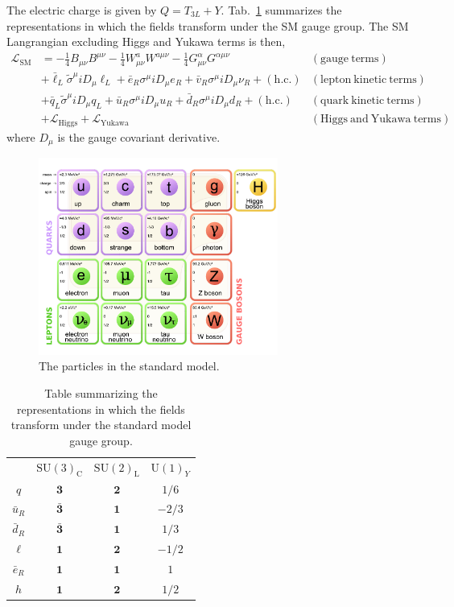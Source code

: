 The electric charge is given by $Q = T_{3L}+Y$. Tab.~\ref{tab:representations} summarizes the
representations in which the fields transform under the SM
gauge group. The SM Langrangian
excluding Higgs and Yukawa terms is then,
\begin{align}
\mathcal{L}_{\mathrm{SM}} &= -\frac{1}{4}B_{\mu\nu}B^{\mu\nu} -\frac{1}{4}W^{a}_{\mu\nu}W^{a\mu\nu} - \frac{1}{4}G^{\alpha}_{\mu\nu}G^{\alpha\mu\nu}
  & \mathrm{(gauge~terms)}\nonumber\\
& +\bar\ell_L\tilde\sigma^{\mu}iD_{\mu}\ell_L +
   \bar e_R\sigma^{\mu}iD_{\mu}e_R + \bar v_R
   \sigma^{\mu}iD_{\mu}\nu_R + (\mathrm{h.c.})& \mathrm{(lepton~kinetic~terms)}\nonumber\\
& +\bar q_L\tilde\sigma^{\mu}iD_{\mu}q_L +
   \bar u_R\sigma^{\mu}iD_{\mu}u_R + \bar d_R
   \sigma^{\mu}iD_{\mu}d_R + (\mathrm{h.c.})& \mathrm{(quark~kinetic~terms)}\nonumber\\
& +\mathcal L_{\mathrm{Higgs}} +\mathcal L_{\mathrm{Yukawa}} &  \mathrm{(Higgs~and~Yukawa~terms)}
\label{eqn:lsm}
\end{align}
where $D_{\mu}$ is the gauge covariant derivative.

\begin{figure}
\centering
\includegraphics[width=0.7\textwidth]{figs/theory/standardmodel.pdf}
\caption{\label{fig:standardmodel} The particles in the standard model.}
\end{figure}

\begin{table}
\centering
\begin{tabular}{c|ccc}
&$\mathrm{SU(3)}_{\mathrm{C}}$&$\mathrm{SU(2)}_{\mathrm{L}}$&$\mathrm{U(1)}_Y$ \\
$q$ & $\mathbf{3}$ & $\mathbf{2}$ & $1/6$\\
$\bar u_R$ & $\mathbf{\bar 3}$ & $\mathbf{1}$ & $-2/3$\\
$\bar d_R$ & $\mathbf{\bar 3}$ & $\mathbf{1}$ & $1/3$\\
$\ell$ & $\mathbf{1}$ & $\mathbf{2}$ & $-1/2$\\
$\bar e_R$ & $\mathbf{1}$ & $\mathbf{1}$ & $1$\\\hline
$h$ & $\mathbf{1}$ & $\mathbf{2}$ & $1/2$
\end{tabular}
\caption{\label{tab:representations} Table summarizing the
    representations in which the fields transform under the standard
    model gauge group.}
\end{table}


